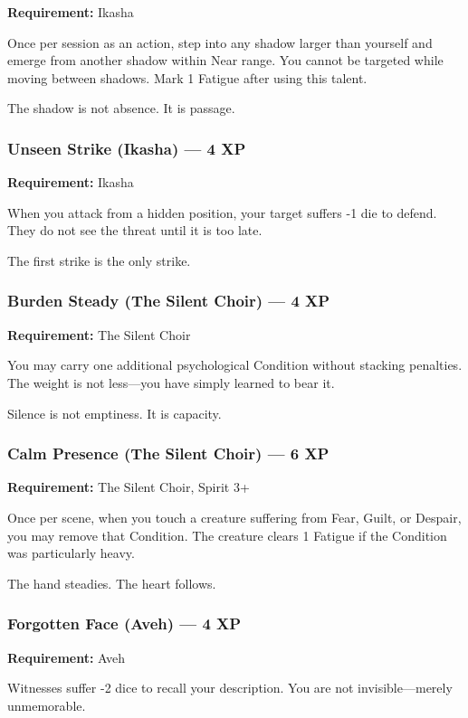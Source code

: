 \textbf{Requirement:} Ikasha

Once per session as an action, step into any shadow larger than yourself and emerge from another shadow within Near range. You cannot be targeted while moving between shadows. Mark 1 Fatigue after using this talent.

The shadow is not absence. It is passage.

\subsubsection{Unseen Strike (Ikasha) — 4 XP}

\textbf{Requirement:} Ikasha

When you attack from a hidden position, your target suffers -1 die to defend. They do not see the threat until it is too late.

The first strike is the only strike.

\subsubsection{Burden Steady (The Silent Choir) — 4 XP}

\textbf{Requirement:} The Silent Choir

You may carry one additional psychological Condition without stacking penalties. The weight is not less—you have simply learned to bear it.

Silence is not emptiness. It is capacity.

\subsubsection{Calm Presence (The Silent Choir) — 6 XP}

\textbf{Requirement:} The Silent Choir, Spirit 3+

Once per scene, when you touch a creature suffering from Fear, Guilt, or Despair, you may remove that Condition. The creature clears 1 Fatigue if the Condition was particularly heavy.

The hand steadies. The heart follows.

\subsubsection{Forgotten Face (Aveh) — 4 XP}

\textbf{Requirement:} Aveh

Witnesses suffer -2 dice to recall your description. You are not invisible—merely unmemorable.

